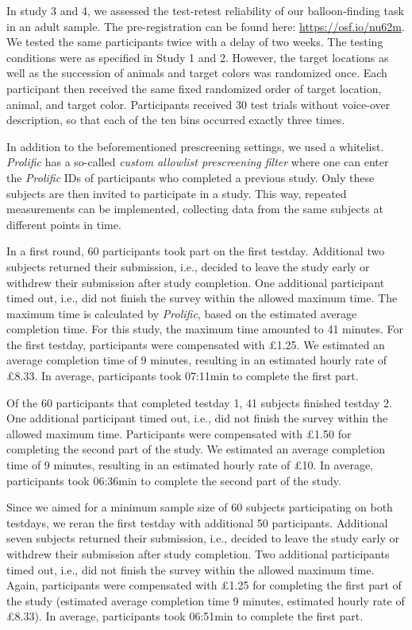\documentclass[
  man,floatsintext]{apa6}
\begin{document}
In study 3 and 4, we assessed the test-retest reliability of our balloon-finding task in an adult sample. The pre-registration can be found here: \url{https://osf.io/nu62m}. We tested the same participants twice with a delay of two weeks. The testing conditions were as specified in Study 1 and 2. However, the target locations as well as the succession of animals and target colors was randomized once. Each participant then received the same fixed randomized order of target location, animal, and target color. Participants received 30 test trials without voice-over description, so that each of the ten bins occurred exactly three times.

In addition to the beforementioned prescreening settings, we used a whitelist. \emph{Prolific} has a so-called \emph{custom allowlist prescreening filter} where one can enter the \emph{Prolific} IDs of participants who completed a previous study. Only these subjects are then invited to participate in a study. This way, repeated measurements can be implemented, collecting data from the same subjects at different points in time.

In a first round, 60 participants took part on the first testday. Additional two subjects returned their submission, i.e., decided to leave the study early or withdrew their submission after study completion. One additional participant timed out, i.e., did not finish the survey within the allowed maximum time. The maximum time is calculated by \emph{Prolific}, based on the estimated average completion time. For this study, the maximum time amounted to 41 minutes. For the first testday, participants were compensated with £1.25. We estimated an average completion time of 9 minutes, resulting in an estimated hourly rate of £8.33. In average, participants took 07:11min to complete the first part.

Of the 60 participants that completed testday 1, 41 subjects finished testday 2. One additional participant timed out, i.e., did not finish the survey within the allowed maximum time. Participants were compensated with £1.50 for completing the second part of the study. We estimated an average completion time of 9 minutes, resulting in an estimated hourly rate of £10. In average, participants took 06:36min to complete the second part of the study.

Since we aimed for a minimum sample size of 60 subjects participating on both testdays, we reran the first testday with additional 50 participants. Additional seven subjects returned their submission, i.e., decided to leave the study early or withdrew their submission after study completion. Two additional participants timed out, i.e., did not finish the survey within the allowed maximum time. Again, participants were compensated with £1.25 for completing the first part of the study (estimated average completion time 9 minutes, estimated hourly rate of £8.33). In average, participants took 06:51min to complete the first part.
\end{document}
